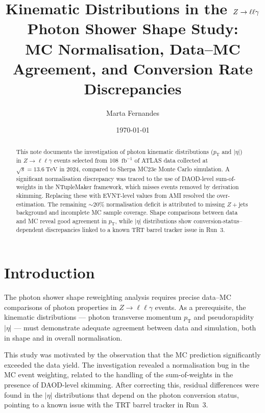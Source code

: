 \documentclass[11pt,a4paper]{article}
\title{Kinematic Distributions in the $\Zllg$ Photon Shower Shape Study:\\
  MC Normalisation, Data--MC Agreement, and Conversion Rate Discrepancies}
\author{Marta Fernandes}
\date{\today}
\newcommand{\pT}{\ensuremath{p_{\mathrm{T}}}\xspace}
\newcommand{\abseta}{\ensuremath{|\eta|}\xspace}
\newcommand{\Zllg}{\ensuremath{Z \to \ell\ell\gamma}\xspace}
\newcommand{\sqrts}{\ensuremath{\sqrt{s} = 13.6~\text{TeV}}\xspace}
\newcommand{\fbinv}{\ensuremath{\text{fb}^{-1}}\xspace}
\begin{document}
\maketitle

\begin{abstract}
This note documents the investigation of photon kinematic distributions
($\pT$ and $\abseta$) in $\Zllg$ events selected from 108~\fbinv of
ATLAS data collected at $\sqrts$ in 2024, compared to Sherpa MC23e
Monte Carlo simulation.  A significant normalisation discrepancy was traced
to the use of DAOD-level sum-of-weights in the NTupleMaker framework,
which misses events removed by derivation skimming.  Replacing these
with EVNT-level values from AMI resolved the over-estimation.  The
remaining ${\sim}20\%$ normalisation deficit is attributed to missing
$Z{+}\text{jets}$ background and incomplete MC sample coverage.  Shape
comparisons between data and MC reveal good agreement in $\pT$, while
$\abseta$ distributions show conversion-status--dependent discrepancies
linked to a known TRT barrel tracker issue in Run~3.
\end{abstract}

\tableofcontents
\clearpage

\section{Introduction}
\label{sec:introduction}

The photon shower shape reweighting analysis requires precise data--MC comparisons
of photon properties in $\Zllg$ events.  As a prerequisite, the kinematic
distributions --- photon transverse momentum $\pT$ and pseudorapidity $\abseta$ ---
must demonstrate adequate agreement between data and simulation, both in
shape and in overall normalisation.

This study was motivated by the observation that the MC prediction
significantly exceeded the data yield.  The investigation revealed a
normalisation bug in the MC event weighting, related to the handling of
the sum-of-weights in the presence of DAOD-level skimming.  After correcting
this, residual differences were found in the $\abseta$ distributions that
depend on the photon conversion status, pointing to a known issue with the
TRT barrel tracker in Run~3.

\end{document}
